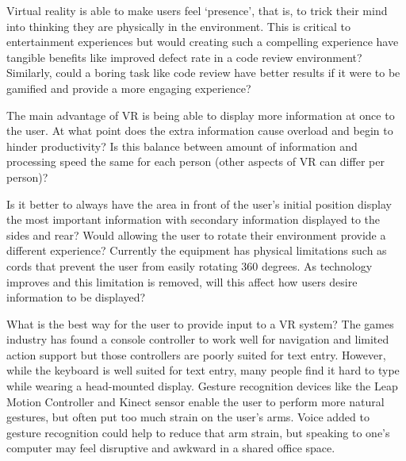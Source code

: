 \documentclass{acm_proc_article-sp}
\begin{document}
Virtual reality is able to make users feel `presence', that is, to trick their mind into thinking they are physically in the environment. This is critical to entertainment experiences but would creating such a compelling experience have tangible benefits like improved defect rate in a code review environment? Similarly, could a boring task like code review have better results if it were to be gamified and provide a more engaging experience? 

The main advantage of VR is being able to display more information at once to the user.  At what point does the extra information cause overload and begin to hinder productivity?  Is this balance between amount of information and processing speed the same for each person (other aspects of VR can differ per person)?

Is it better to always have the area in front of the user's initial position display the most important information with secondary information displayed to the sides and rear? Would allowing the user to rotate their environment provide a different experience?
Currently the equipment has physical limitations such as cords that prevent the user from easily rotating 360 degrees. As technology improves and this limitation is removed, will this affect how users desire information to be displayed?



What is the best way for the user to provide input to a VR system? The games industry has found a console controller to work well for navigation and limited action support but those controllers are poorly suited for text entry. However, while the keyboard is well suited for text entry, many people find it hard to type while wearing a head-mounted display. Gesture recognition devices like the Leap Motion Controller and Kinect sensor enable the user to perform more natural gestures, but often put too much strain on the user's arms. Voice added to gesture recognition could help to reduce that arm strain, but speaking to one's computer may feel disruptive and awkward in a shared office space.
\end{document}
